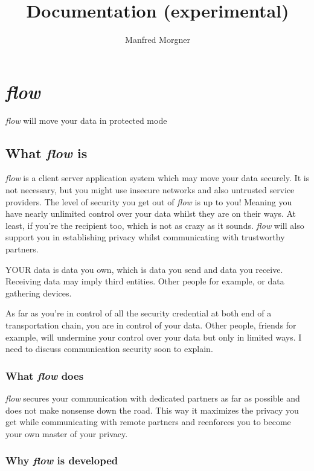 \documentclass[twoside,a4paper,english,12pt,authoryear,openright]{book}
\title{\flow Documentation (experimental)}
\author{Manfred Morgner}
\newcommand{\flow}{\textit{flow} }
\begin{document}
\maketitle
\frontmatter %
\tableofcontents



\mainmatter



\chapter{\flow}

\flow will move your data in protected mode

\section{What \flow is}

\flow is a client server application system which may move your data securely. It is not necessary, but you might use insecure networks and also untrusted service providers. The level of security you get out of \flow is up to you! Meaning you have nearly unlimited control over your data whilst they are on their ways. At least, if you're the recipient too, which is not as crazy as it sounds. \flow will also support you in establishing privacy whilst communicating with trustworthy partners.

YOUR data is data you own, which is data you send and data you receive. Receiving data may imply third entities. Other people for example, or data gathering devices.

As far as you're in control of all the security credential at both end of a transportation chain, you are in control of your data. Other people, friends for example, will undermine your control over your data but only in limited ways. I need to discuss communication security soon to explain.

\subsection{What \flow does}

\flow secures your communication with dedicated partners as far as possible and does not make nonsense down the road. This way it maximizes the privacy you get while communicating with remote partners and reenforces you to become your own master of your privacy.

\subsection{Why \flow is developed}
\end{document}
